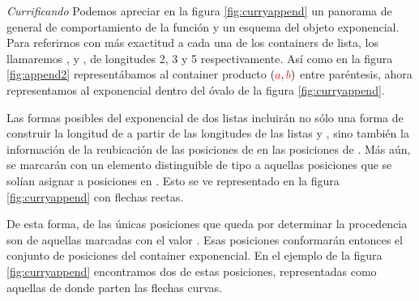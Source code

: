 \begin{example} {\it Currificando}
Podemos apreciar en la figura \ref{fig:curryappend} un panorama de general de comportamiento de la función  y un esquema del objeto exponencial. Para referirnos con más exactitud a cada una de los containers de lista, los llamaremos ,  y , de longitudes 2, 3 y 5 respectivamente. Así como en la figura \ref{fig:append2} representábamos al container producto $(\textcolor{red}{a},\textcolor{red}{b})$ entre paréntesis, ahora representamos al exponencial dentro del óvalo de la figura \ref{fig:curryappend}.

Las formas posibles del exponencial de dos listas incluirán no sólo una forma de construir la longitud de  a partir de las longitudes de las listas  y , sino también la información de la reubicación de las posiciones de  en las posiciones de . Más aún, se marcarán con un elemento distinguible  de tipo \AgdaDatatype{$\top$} a aquellas posiciones que se solían asignar a posiciones en . Esto se ve representado en la figura \ref{fig:curryappend} con flechas rectas.

De esta forma, de las únicas posiciones que queda por determinar la procedencia son de aquellas marcadas con el valor . Esas posiciones conformarán entonces el conjunto de posiciones del container exponencial. En el ejemplo de la figura \ref{fig:curryappend} encontramos dos de estas posiciones, representadas como aquellas de donde parten las flechas curvas.


\end{example}
